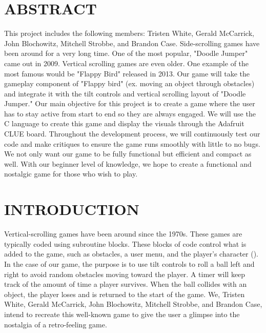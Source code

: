 \documentclass[12pt]{article}
\begin{document}
\tableofcontents
\pagebreak

\newpage
\section{ABSTRACT}
This project includes the following members: Tristen White, Gerald McCarrick, John Blochowitz, Mitchell Strobbe, and Brandon Case. Side-scrolling games have been around for a very long time. One of the most popular, "Doodle Jumper" came out in 2009. Vertical scrolling games are even older. One example of the most famous would be "Flappy Bird" released in 2013. Our game will take the gameplay component of "Flappy bird" (ex. moving an object through obstacles) and integrate it with the tilt controls and vertical scrolling layout of "Doodle Jumper." Our main objective for this project is to create a game where the user has to stay active from start to end so they are always engaged. We will use the C language to create this game and display the visuals through the Adafruit CLUE board. Throughout the development process, we will continuously test our code and make critiques to ensure the game runs smoothly with little to no bugs. We not only want our game to be fully functional but efficient and compact as well. With our beginner level of knowledge, we hope to create a functional and nostalgic game for those who wish to play.

\newpage
\section{INTRODUCTION}
Vertical-scrolling games have been around since the 1970s. These games are typically coded using subroutine blocks. These blocks of code control what is added to the game, such as obstacles, a user menu, and the player's character (\parencite{doi:10.1080/01449290410001669923}). In the case of our game, the purpose is to use tilt controls to roll a ball left and right to avoid random obstacles moving toward the player. A timer will keep track of the amount of time a player survives. When the ball collides with an object, the player loses and is returned to the start of the game. We, Tristen White, Gerald McCarrick, John Blochowitz, Mitchell Strobbe, and Brandon Case, intend to recreate this well-known game to give the user a glimpse into the nostalgia of a retro-feeling game.
\end{document}

